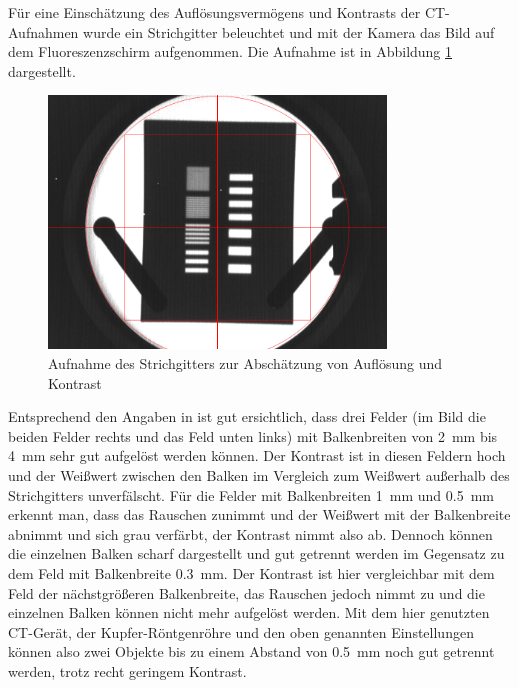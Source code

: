 \documentclass[11pt, a4paper]{article}
\numberwithin{equation}{section}
\begin{document}
Für eine Einschätzung des Auflösungsvermögens und Kontrasts der CT-Aufnahmen wurde ein Strichgitter beleuchtet und mit der Kamera das Bild auf dem Fluoreszenzschirm aufgenommen.
Die Aufnahme ist in Abbildung \ref{fig:ct_kontrast} dargestellt.
\begin{figure}[ht]
	\centering
	\includegraphics[width=0.8\textwidth]{./figures/ct/strichgitter2.png}
	\caption{Aufnahme des Strichgitters zur Abschätzung von Auflösung und Kontrast}
	\label{fig:ct_kontrast}
\end{figure}
Entsprechend den Angaben in \cite{anleitung} ist gut ersichtlich, dass drei Felder (im Bild die beiden Felder rechts und das Feld unten links) mit Balkenbreiten von \SI{2}{mm} bis \SI{4}{mm} sehr gut aufgelöst werden können.
Der Kontrast ist in diesen Feldern hoch und der Weißwert zwischen den Balken im Vergleich zum Weißwert außerhalb des Strichgitters unverfälscht.
Für die Felder mit Balkenbreiten \SI{1}{mm} und \SI{0.5}{mm} erkennt man, dass das Rauschen zunimmt und der Weißwert mit der Balkenbreite abnimmt und sich grau verfärbt, der Kontrast nimmt also ab.
Dennoch können die einzelnen Balken scharf dargestellt und gut getrennt werden im Gegensatz zu dem Feld mit Balkenbreite \SI{0.3}{mm}.
Der Kontrast ist hier vergleichbar mit dem Feld der nächstgrößeren Balkenbreite, das Rauschen jedoch nimmt zu und die einzelnen Balken können nicht mehr aufgelöst werden.
Mit dem hier genutzten CT-Gerät, der Kupfer-Röntgenröhre und den oben genannten Einstellungen können also zwei Objekte bis zu einem Abstand von \SI{0.5}{mm} noch gut getrennt werden, trotz recht geringem Kontrast.
\end{document}
